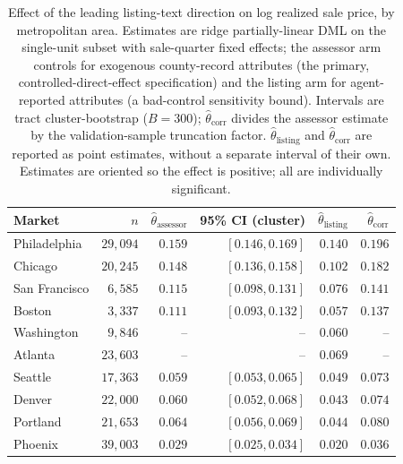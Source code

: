 \begin{table}[H]
\centering
\caption{Effect of the leading listing-text direction on log realized sale price, by metropolitan area. Estimates are ridge partially-linear DML on the single-unit subset with sale-quarter fixed effects; the assessor arm controls for exogenous county-record attributes (the primary, controlled-direct-effect specification) and the listing arm for agent-reported attributes (a bad-control sensitivity bound). Intervals are tract cluster-bootstrap ($B=300$); $\hat\theta_{\text{corr}}$ divides the assessor estimate by the validation-sample truncation factor. $\hat\theta_{\text{listing}}$ and $\hat\theta_{\text{corr}}$ are reported as point estimates, without a separate interval of their own. Estimates are oriented so the effect is positive; all are individually significant.}
\label{tab:soldprice}
\small
\begin{tabular}{lrrrrr}
\toprule
Market & $n$ & $\hat\theta_{\text{assessor}}$ & 95\% CI (cluster) & $\hat\theta_{\text{listing}}$ & $\hat\theta_{\text{corr}}$ \\
\midrule
Philadelphia & $29{,}094$ & $0.159$ & $[0.146, 0.169]$ & $0.140$ & $0.196$ \\
Chicago & $20{,}245$ & $0.148$ & $[0.136, 0.158]$ & $0.102$ & $0.182$ \\
San Francisco & $6{,}585$ & $0.115$ & $[0.098, 0.131]$ & $0.076$ & $0.141$ \\
Boston & $3{,}337$ & $0.111$ & $[0.093, 0.132]$ & $0.057$ & $0.137$ \\
Washington & $9{,}846$ & -- & -- & $0.060$ & -- \\
Atlanta & $23{,}603$ & -- & -- & $0.069$ & -- \\
Seattle & $17{,}363$ & $0.059$ & $[0.053, 0.065]$ & $0.049$ & $0.073$ \\
Denver & $22{,}000$ & $0.060$ & $[0.052, 0.068]$ & $0.043$ & $0.074$ \\
Portland & $21{,}653$ & $0.064$ & $[0.056, 0.069]$ & $0.044$ & $0.080$ \\
Phoenix & $39{,}003$ & $0.029$ & $[0.025, 0.034]$ & $0.020$ & $0.036$ \\
\bottomrule
\end{tabular}
\end{table}
